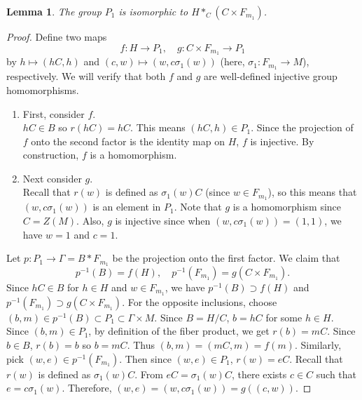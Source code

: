 \documentclass[11pt]{amsart}
\newtheorem{lem}[thm]{Lemma}
\theoremstyle{definition}
\begin{document}
 \begin{lem} \label{lem:A amalgam}
 The group $P_1$ is isomorphic to $H*_C(C \times F_{m_1} )$.
 \end{lem}
 \begin{proof}
 Define two maps $$f:H \to P_1, \quad g: C \times F_{m_1} \to P_1 $$
 by $h \mapsto (hC,h)$ and $(c,w) \mapsto (w,c \sigma_1(w))$ (here, $\sigma_1:F_{m_1} \to M$), respectively.
 We will verify that both $f$ and $g$ are well-defined injective group homomorphisms.

 \begin{enumerate}
    \item First, consider $f$. \\
    $hC \in B$ so $r(hC)=hC$. This means $(hC,h) \in P_1$.
    Since the projection of $f$ onto the second factor is the identity map on $H$, $f$ is injective. By construction, $f$ is a homomorphism.
    \item Next consider $g$. \\ 
    Recall that $r(w)$ is defined as $\sigma_1(w)C$ (since $w \in F_{m_1}$), so this means that $(w,c \sigma_1(w))$ is an element in $P_1$.
    Note that $g$ is a homomorphism since $C = Z(M)$.
    Also, $g$ is injective since when $(w,c \sigma_1(w))=(1,1)$, we have $w=1$ and $c=1$.
 \end{enumerate}

 Let $p: P_1 \to \Gamma = B*F_{m_1}$ be the projection onto the first factor.
 We claim that
 $$ p^{-1}(B)=f(H), \quad p^{-1}(F_{m_1}) = g(C \times F_{m_1}). $$
 Since $hC \in B$ for $h \in H$ and $w \in F_{m_1}$, we have $ p^{-1}(B) \supset f(H) $ and $ p^{-1}(F_{m_1}) \supset g(C \times F_{m_1}). $
 For the opposite inclusions, choose $(b,m) \in p^{-1}(B) \subset P_1 \subset \Gamma \times M$.
 Since $B=H/C$, $b=hC$ for some $h \in H$.
 Since $(b,m) \in P_1$, by definition of the fiber product, we get $r(b)=mC$. Since $b \in B$, $r(b)=b$ so $b=mC$.
 Thus $(b,m)=(mC,m)=f(m)$.
 Similarly, pick $(w,e) \in p^{-1}(F_{m_1})$.
 Then since $(w,e) \in P_1$, $r(w)=eC$. Recall that $r(w)$ is defined as $\sigma_1(w)C$.
 From $eC=\sigma_1(w)C$, there exists $c \in C$ such that $e=c \sigma_1(w)$.
 Therefore, $(w,e)=(w,c \sigma_1(w))=g\left((c,w)\right)$.


\end{proof}
\end{document}

